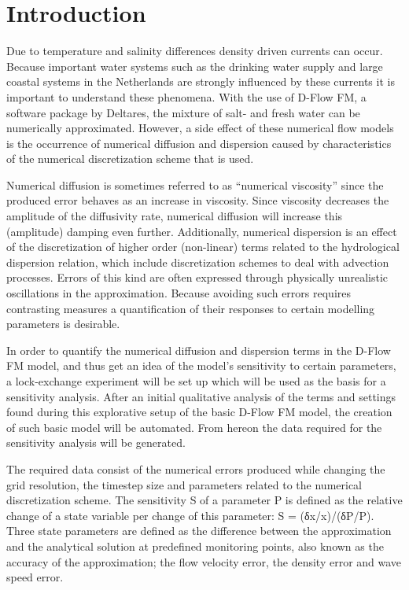 \chapter{Introduction}\label{introduction}

Due to temperature and salinity differences density driven currents can
occur. Because important water systems such as the drinking water supply
and large coastal systems in the Netherlands are strongly influenced by
these currents it is important to understand these phenomena. With the
use of D-Flow FM, a software package by Deltares, the mixture of salt-
and fresh water can be numerically approximated. However, a side effect
of these numerical flow models is the occurrence of numerical diffusion
and dispersion caused by characteristics of the numerical discretization
scheme that is used.

Numerical diffusion is sometimes referred to as ``numerical viscosity''
since the produced error behaves as an increase in viscosity. Since
viscosity decreases the amplitude of the diffusivity rate, numerical
diffusion will increase this (amplitude) damping even further.
Additionally, numerical dispersion is an effect of the discretization of
higher order (non-linear) terms related to the hydrological dispersion
relation, which include discretization schemes to deal with advection
processes. Errors of this kind are often expressed through physically
unrealistic oscillations in the approximation. Because avoiding such
errors requires contrasting measures a quantification of their responses
to certain modelling parameters is desirable. \citep[
\citet{obrien_study_1950}]{zijlema_computational_2015}

In order to quantify the numerical diffusion and dispersion terms in the
D-Flow FM model, and thus get an idea of the model's sensitivity to
certain parameters, a lock-exchange experiment will be set up which will
be used as the basis for a sensitivity analysis. After an initial
qualitative analysis of the terms and settings found during this
explorative setup of the basic D-Flow FM model, the creation of such
basic model will be automated. From hereon the data required for the
sensitivity analysis will be generated.

The required data consist of the numerical errors produced while
changing the grid resolution, the timestep size and parameters related
to the numerical discretization scheme. The sensitivity S of a parameter
P is defined as the relative change of a state variable per change of
this parameter: S = (δx/x)/(δP/P). Three state parameters are defined as
the difference between the approximation and the analytical solution at
predefined monitoring points, also known as the accuracy of the
approximation; the flow velocity error, the density error and wave speed
error.

